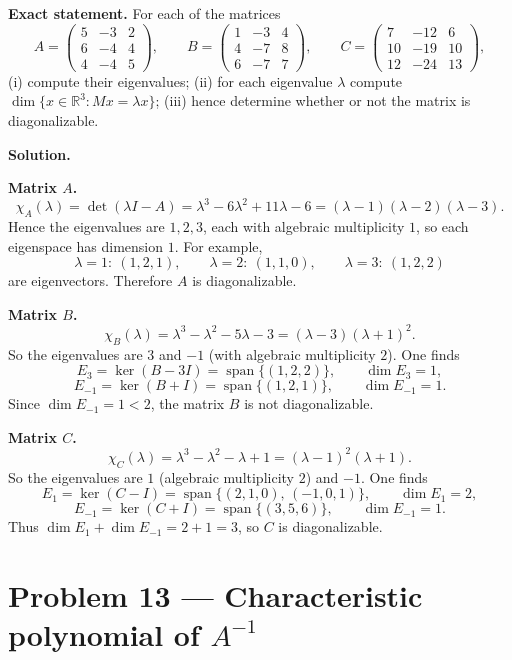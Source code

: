 \documentclass[12pt,a4paper]{article}
\theoremstyle{plain}
\theoremstyle{definition}      %
\begin{document}
\textbf{Exact statement.}
For each of the matrices
\[
A=\begin{pmatrix}
	5&-3&2\\
	6&-4&4\\
	4&-4&5
\end{pmatrix},\qquad
B=\begin{pmatrix}
	1&-3&4\\
	4&-7&8\\
	6&-7&7
\end{pmatrix},\qquad
C=\begin{pmatrix}
	7&-12&6\\
	10&-19&10\\
	12&-24&13
\end{pmatrix},
\]
(i) compute their eigenvalues;
(ii) for each eigenvalue \(\lambda\) compute \(\dim\{x\in\mathbb R^3: Mx=\lambda x\}\);
(iii) hence determine whether or not the matrix is diagonalizable.

\textbf{Solution.}

\textbf{Matrix \(A\).}
\[
\chi_A(\lambda)=\det(\lambda I-A)=\lambda^3-6\lambda^2+11\lambda-6=(\lambda-1)(\lambda-2)(\lambda-3).
\]
Hence the eigenvalues are \(1,2,3\), each with algebraic multiplicity \(1\), so each eigenspace has dimension \(1\).
For example,
\[
\lambda=1:\ (1,2,1),\qquad
\lambda=2:\ (1,1,0),\qquad
\lambda=3:\ (1,2,2)
\]
are eigenvectors. Therefore \(A\) is diagonalizable.

\textbf{Matrix \(B\).}
\[
\chi_B(\lambda)=\lambda^3-\lambda^2-5\lambda-3=(\lambda-3)(\lambda+1)^2.
\]
So the eigenvalues are \(3\) and \(-1\) (with algebraic multiplicity \(2\)).
One finds
\[
E_3=\ker(B-3I)=\operatorname{span}\{(1,2,2)\},\qquad \dim E_3=1,
\]
\[
E_{-1}=\ker(B+I)=\operatorname{span}\{(1,2,1)\},\qquad \dim E_{-1}=1.
\]
Since \(\dim E_{-1}=1<2\), the matrix \(B\) is not diagonalizable.

\textbf{Matrix \(C\).}
\[
\chi_C(\lambda)=\lambda^3-\lambda^2-\lambda+1=(\lambda-1)^2(\lambda+1).
\]
So the eigenvalues are \(1\) (algebraic multiplicity \(2\)) and \(-1\).
One finds
\[
E_1=\ker(C-I)=\operatorname{span}\{(2,1,0),\,(-1,0,1)\},\qquad \dim E_1=2,
\]
\[
E_{-1}=\ker(C+I)=\operatorname{span}\{(3,5,6)\},\qquad \dim E_{-1}=1.
\]
Thus \(\dim E_1+\dim E_{-1}=2+1=3\), so \(C\) is diagonalizable.


\section*{Problem 13 — Characteristic polynomial of \(A^{-1}\)}
\end{document}
